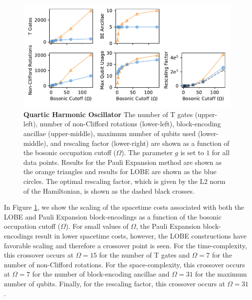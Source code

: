 \begin{figure}
    \label{fig:qosc}
    \includegraphics[width = 16cm]{figures/quartic_oscillator.pdf}
    \caption{
        \textbf{Quartic Harmonic Oscillator}
        The number of T gates (upper-left), number of non-Clifford rotations (lower-left), block-encoding ancillae (upper-middle), maximum number of qubits used (lower-middle), and rescaling factor (lower-right) are shown as a function of the bosonic occupation cutoff ($\Omega$).
        The parameter $g$ is set to $1$ for all data points.
        Results for the Pauli Expansion method are shown as the orange triangles and results for LOBE are shown as the blue circles.
        The optimal rescaling factor, which is given by the L2 norm of the Hamiltonian, is shown as the dashed black crosses.
    }
\end{figure}

In Figure \ref{fig:qosc}, we show the scaling of the spacetime costs associated with both the LOBE and Pauli Expansion block-encodings as a function of the bosonic occupation cutoff ($\Omega$).
For small values of $\Omega$, the Pauli Expansion block-encodings result in lower spacetime costs, however, the LOBE constructions have favorable scaling and therefore a crossover point is seen.
For the time-complexity, this crossover occurs at $\Omega = 15$ for the number of T gates and $\Omega = 7$ for the number of non-Clifford rotations.
For the space-complexity, this crossover occurs at $\Omega = 7$ for the number of block-encoding ancillae and $\Omega = 31$ for the maximum number of qubits.
Finally, for the rescaling factor, this crossover occurs at $\Omega = 31$.
